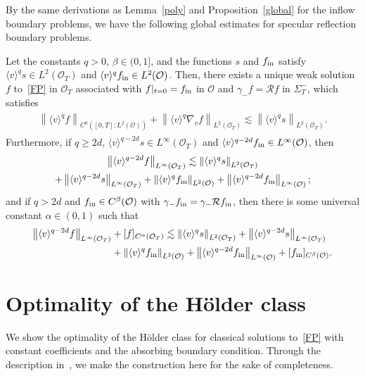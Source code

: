 \documentclass[10pt]{amsart}
\theoremstyle{definition}\newtheorem{defi}[theo]{Definition}\newtheorem{rema}[theo]{Remark}\newtheorem{exam}[theo]{Example}\newtheorem{exem}[theo]{Example}\newtheorem{nota}[theo]{Notation}
\newcommand*\fin {f_{\rm in}}
\newcommand*\RR {\mathcal{R}}
\newcommand*\OO {\mathcal{O}}
\newcommand{\lv}{\langle v\rangle}
\begin{document}
By the same derivations as Lemma~\ref{poly} and Proposition~\ref{global} for the inflow boundary problems, we have the following global estimates for specular reflection boundary problems.

\begin{prop}\label{globals}
Let the constants $q>0$, $\beta\in(0,1]$, and the functions $s$ and $\fin$ satisfy $\lv^qs\in L^2(\OO_T)$ and $\lv^q\fin\in L^2(\OO)$. Then, there exists a unique weak solution $f$ to~\eqref{FP} in $\OO_T$ associated with $f|_{t=0}=\fin$ in $\OO$ and $\gamma_-f=\RR f$ in $\Sigma_T^-$, which satisfies
\begin{align*}
\begin{split}
\left\|\lv^qf\right\|_{C^0\left([0,T];L^2(\OO)\right)} +
\left\|\lv^q\nabla_vf\right\|_{L^2(\OO_T)}
\lesssim \left\|\lv^qs\right\|_{L^2(\OO_T)}.
\end{split}
\end{align*}
Furthermore, if $q\ge 2d$, $\lv^{q-2d}s\in L^\infty(\OO_T)$ and $\lv^{q-2d}\fin\in L^\infty(\OO)$, then
\begin{multline*}
\left\|\lv^{q-2d}f\right\|_{L^\infty(\OO_T)}
\lesssim \left\|\lv^{q}s\right\|_{L^2(\OO_T)} \\
+ \left\|\lv^{q-2d}s\right\|_{L^\infty(\OO_T)}
+ \left\|\lv^{q}\fin\right\|_{L^2(\OO)} + \left\|\lv^{q-2d}\fin\right\|_{L^\infty(\OO)};
\end{multline*}
and if $q>2d$ and $\fin\in C^\beta(\OO)$ with $\gamma_-\fin=\gamma_-\RR\fin$, then there is some universal constant $\alpha\in(0,1)$ such that
\begin{align*}
\left\|\lv^{q-2d}f\right\|_{L^\infty(\OO_T)} &+[f]_{C^\alpha(\OO_T)}
\lesssim \left\|\lv^{q}s\right\|_{L^2(\OO_T)} + \left\|\lv^{q-2d}s\right\|_{L^\infty(\OO_T)} \\
&+\left\|\lv^{q}\fin\right\|_{L^2(\OO)} + \left\|\lv^{q-2d}\fin\right\|_{L^\infty(\OO)} + [\fin]_{C^\beta(\OO)}.
\end{align*}
\end{prop}

\appendix

\section{Optimality of the H\"older class}\label{counterexample}
We show the optimality of the H\"older class for classical solutions to~\eqref{FP} with constant coefficients and the absorbing boundary condition. Through the description in~\cite[Claim~3.7]{HJV}, we make the construction here for the sake of completeness.
\end{document}
